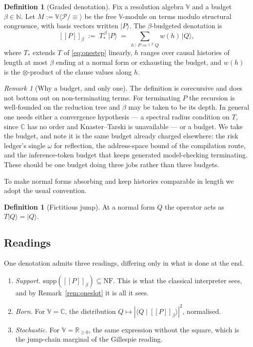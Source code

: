 \documentclass[11pt,a4paper]{article}
\theoremstyle{plain}
\theoremstyle{definition}
\newtheorem{definition}[theorem]{Definition}
\theoremstyle{remark}
\newtheorem{remark}[theorem]{Remark}
\newcommand{\sem}[1]{[\![#1]\!]}
\newcommand{\V}{\mathbb{V}}
\newcommand{\Rnn}{\mathbb{R}_{\geq 0}}
\newcommand{\Cx}{\mathbb{C}}
\newcommand{\Nat}{\mathbb{N}}
\newcommand{\Proc}{\mathcal{P}}
\newcommand{\NF}{\mathrm{NF}}
\newcommand{\supp}{\mathrm{supp}}
\newcommand{\scong}{\equiv}
\newcommand{\tensorv}{\otimes}
\begin{document}
\begin{definition}[Graded denotation]\label{def:denotation}
Fix a resolution algebra $\V$ and a budget $\beta \in \Nat$. Let
$M := \V\langle \Proc/{\scong}\rangle$ be the free $\V$-module on terms modulo
structural congruence, with basis vectors written $\lvert P \rangle$. The
$\beta$-budgeted denotation is
\[
  \sem{P}_\beta \;:=\; T_{\!*}^{\,\beta}\,\lvert P \rangle
  \;=\;\!\!\sum_{h \,:\, P \Rightarrow^{\leq\beta} Q}\!\! w(h)\,\lvert Q\rangle ,
\]
where $T_*$ extends $T$ of \eqref{eq:onestep} linearly, $h$ ranges over causal
histories of length at most $\beta$ ending at a normal form or exhausting the
budget, and $w(h)$ is the $\tensorv$-product of the clause values along $h$.
\end{definition}

\begin{remark}[Why a budget, and only one]\label{rem:budget}
The definition is corecursive and does not bottom out on non-terminating terms.
For terminating $P$ the recursion is well-founded on the reduction tree and
$\beta$ may be taken to be its depth. In general one needs either a convergence
hypothesis --- a spectral radius condition on $T$, since $\Cx$ has no order and
Knaster--Tarski is unavailable --- or a budget. We take the budget, and note it
is the same budget already charged elsewhere: the risk ledger's single $\omega$
for reflection, the address-space bound of the compilation route, and the
inference-token budget that keeps generated model-checking terminating. These
should be one budget doing three jobs rather than three budgets.
\end{remark}

To make normal forms absorbing and keep histories comparable in length we adopt
the usual convention.

\begin{definition}[Fictitious jump]\label{def:fict}
At a normal form $Q$ the operator acts as $T\lvert Q\rangle = \lvert Q\rangle$.
\end{definition}

\subsection{Readings}\label{ssec:pathsum}

One denotation admits three readings, differing only in what is done at the end.

\begin{enumerate}[leftmargin=1.4em,itemsep=2pt]
\item \emph{Support.} $\supp(\sem{P}_\beta) \subseteq \NF$. This is what the
classical interpreter sees, and by Remark~\ref{rem:oneslot} it is all it sees.
\item \emph{Born.} For $\V = \Cx$, the distribution
$Q \mapsto |\langle Q \mid \sem{P}_\beta\rangle|^2$, normalised.
\item \emph{Stochastic.} For $\V = \Rnn$, the same expression without the
square, which is the jump-chain marginal of the Gillespie reading.
\end{enumerate}
\end{document}
